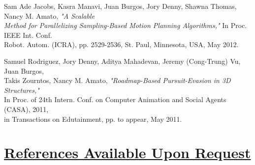 \documentclass[8pt]{res}
\begin{document}
\begin{resume}
    Sam Ade Jacobs, Kasra Manavi, Juan Burgos, Jory Denny, Shawna Thomas, Nancy M. Amato, \emph{"A Scalable \\
    Method for Parallelizing Sampling-Based Motion Planning Algorithms,"} In Proc. IEEE Int. Conf. \\
    Robot. Autom. (ICRA), pp. 2529-2536, St. Paul, Minnesota, USA, May 2012. 

    Samuel Rodriguez, Jory Denny, Aditya Mahadevan, Jeremy (Cong-Trung) Vu, Juan Burgos, \\
    Takis Zourntos, Nancy M. Amato, \emph{"Roadmap-Based Pursuit-Evasion in 3D Structures,"} \\
    In Proc. of 24th Intern. Conf. on Computer Animation and Social Agents (CASA), 2011, \\
    in Transactions on Edutainment, pp. to appear, May 2011.


    \section{\underline{References Available Upon Request}}


  \end{resume}
\end{document}
